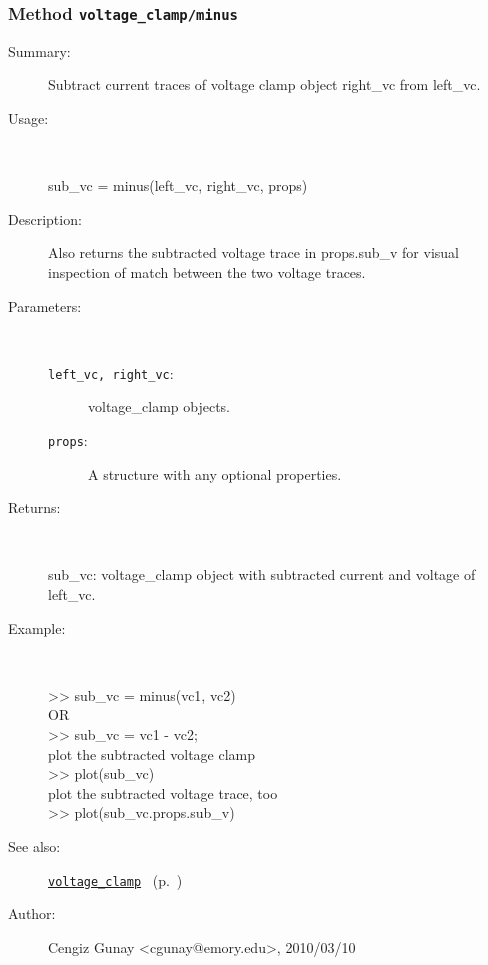 \subsubsection[Method \texttt{minus}]{Method \texttt{voltage\_clamp/minus}}%
%
\label{ref_voltage_clamp__minus}%
\hypertarget{ref_voltage_clamp__minus}{}%
\begin{description}
\item[Summary:]Subtract current traces of voltage clamp object right\_vc from left\_vc.
%
\item[Usage:]~%
\begin{lyxcode}%
sub\_vc = minus(left\_vc, right\_vc, props)
%
\end{lyxcode}%
%
\item[Description:]%
Also returns the subtracted voltage trace in props.sub\_v for visual
 inspection of match between the two voltage traces.
\item[Parameters:]~
\begin{description}%
\item[\texttt{left\_vc, right\_vc}:]
 voltage\_clamp objects.
\item[\texttt{props}:]
 A structure with any optional properties.
\end{description}%
%
\item[Returns:
]~

   sub\_vc: voltage\_clamp object with subtracted current and 
     voltage of left\_vc.
%
\item[Example:]~
\begin{lyxcode} >> sub\_vc = minus(vc1, vc2)
\\%
 OR
\\%
 >> sub\_vc = vc1 - vc2;
\\%
 plot the subtracted voltage clamp
\\%
 >> plot(sub\_vc)
\\%
 plot the subtracted voltage trace, too
\\%
 >> plot(sub\_vc.props.sub\_v)
\\%
\end{lyxcode}
%
\item[See also:]%
\hyperlink{ref_voltage_clamp}{\texttt{voltage\_clamp}}%
\ (p.~\pageref{ref_voltage_clamp})%
%
%
\item[Author:]%
Cengiz Gunay <cgunay@emory.edu>, 2010/03/10
%
\end{description}
\methodline%
